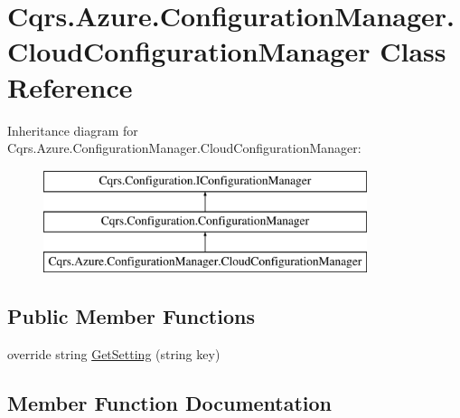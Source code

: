 \hypertarget{classCqrs_1_1Azure_1_1ConfigurationManager_1_1CloudConfigurationManager}{}\section{Cqrs.\+Azure.\+Configuration\+Manager.\+Cloud\+Configuration\+Manager Class Reference}
\label{classCqrs_1_1Azure_1_1ConfigurationManager_1_1CloudConfigurationManager}
Inheritance diagram for Cqrs.\+Azure.\+Configuration\+Manager.\+Cloud\+Configuration\+Manager\+:\begin{figure}[H]
\begin{center}
\leavevmode
\includegraphics[height=3.000000cm]{classCqrs_1_1Azure_1_1ConfigurationManager_1_1CloudConfigurationManager}
\end{center}
\end{figure}
\subsection*{Public Member Functions}
\begin{DoxyCompactItemize}
\item 
override string \hyperlink{classCqrs_1_1Azure_1_1ConfigurationManager_1_1CloudConfigurationManager_a48228b7e2204a2449426de32cd6ecc65_a48228b7e2204a2449426de32cd6ecc65}{Get\+Setting} (string key)
\end{DoxyCompactItemize}


\subsection{Member Function Documentation}
\mbox{\label{classCqrs_1_1Azure_1_1ConfigurationManager_1_1CloudConfigurationManager_a48228b7e2204a2449426de32cd6ecc65_a48228b7e2204a2449426de32cd6ecc65}} 
